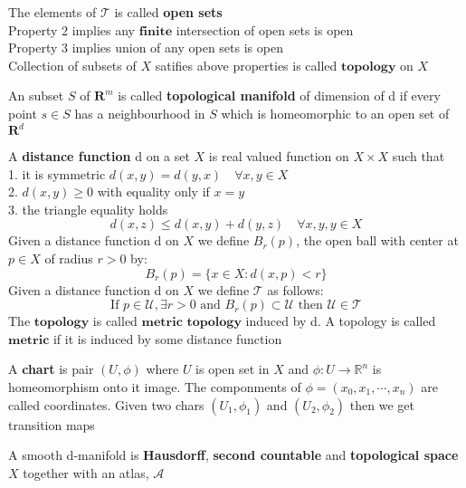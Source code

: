 \documentclass{article} \usepackage{amsmath} \usepackage{amsfonts}
\begin{document}
\noindent
The elements of $\mathcal{T}$ is called \textbf{open sets} \\
Property $\mathit{2}$ implies any $\mathbf{finite}$ intersection of open sets is open \\
Property $\mathit{3}$ implies union of any open sets is open \\
Collection of subsets of $X$ satifies above properties is called $\textbf{topology}$ on $X$ \\

\begin{defn}
    An subset $S$ of $\mathbf{R}^m$ is called \textbf{topological manifold} of dimension of d if every point $s \in S$ has a neighbourhood in $S$ which is homeomorphic to an open set of $\mathbf{R}^d$
\end{defn}

\begin{defn}
    A \textbf{distance function} d on a set $X$ is real valued function on $X \times X$ such that \\
    1. it is symmetric $d(x, y) = d(y, x) \quad \forall x, y \in X$ \\
    2. $d(x, y) \geq 0 $ with equality only if $x = y$ \\
    3. the triangle equality holds  
    \[ d(x, z) \leq d(x, y) + d(y, z) \quad \forall x, y, y \in X \]
    Given a distance function d on $X$ we define $B_r(p)$, the open ball with center at $p \in X$ of radius $r > 0$ by:\\
    \[ B_r(p) = \{x \in X : d(x, p) < r\} \]
    Given a distance function d on $X$ we define $\mathcal{T}$ as follows:
    \[ \text{If } p \in \mathcal{U}, \exists r > 0 \text{ and } B_r(p) \subset \mathcal{U} \text{ then } \mathcal{U} \in \mathcal{T} \]
    The $\textbf{topology}$ is called $\textbf{metric topology}$ induced by d. A topology is called $\textbf{metric}$ if it is induced by some distance function
\end{defn}


\begin{defn}
    A \textbf{chart} is pair $(U, \phi)$ where $U$ is open set  in $X$ and $\phi: U \rightarrow \mathbb{R}^n$ is homeomorphism onto it image.
    The componments of $\phi = (x_0, x_1, \cdots , x_n)$ are called coordinates.
    Given two chars $(U_1, \phi_1)$ and $(U_2, \phi_2)$ then we get transition maps  
\end{defn}

\begin{defn}
A smooth d-manifold is \textbf{Hausdorff}, \textbf{second countable} and \textbf{topological space} $X$ together with an atlas, $\mathcal{A}$
\end{defn}
\end{document}
